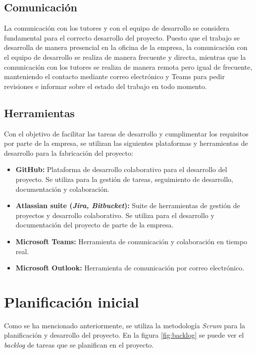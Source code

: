 \subsection{Comunicación}\label{subsec:comunicación}
La comunicación con los tutores y con el equipo de desarrollo se considera
fundamental para el correcto desarrollo del proyecto. Puesto que el trabajo se
desarrolla de manera presencial en la oficina de la empresa, la comunicación con
el equipo de desarrollo se realiza de manera frecuente y directa, mientras que
la comunicación con los tutores se realiza de manera remota pero igual de
frecuente, manteniendo el contacto mediante correo electrónico y Teams para
pedir revisiones e informar sobre el estado del trabajo en todo momento.


\subsection{Herramientas}\label{subsec:herr_planif}
Con el objetivo de facilitar las tareas de desarrollo y cumplimentar los
requisitos por parte de la empresa, se utilizan las siguientes plataformas y
herramientas de desarrollo para la fabricación del proyecto:

\begin{itemize}
	\item \textbf{GitHub:} Plataforma de desarrollo colaborativo para el
		desarrollo del proyecto. Se utiliza para la gestión de tareas,
		seguimiento de desarrollo, documentación y colaboración.
	\item \textbf{Atlassian suite (\emph{Jira, Bitbucket}):} Suite de
		herramientas de gestión de proyectos y desarrollo colaborativo. Se
		utiliza para el desarrollo y documentación del proyecto de parte de la
		empresa.
	\item \textbf{Microsoft Teams:} Herramienta de comunicación y colaboración
		en tiempo real.
	\item \textbf{Microsoft Outlook:} Herramienta de comunicación por correo
		electrónico.
\end{itemize}


\newpage{}
\section{Planificación inicial}\label{sec:planif_inicial}
Como se ha mencionado anteriormente, se utiliza la metodología \textit{Scrum}
para la planificación y desarrollo del proyecto. En la figura \ref{fig:backlog}
se puede ver el \textit{backlog} de tareas que se planifican en el proyecto.


